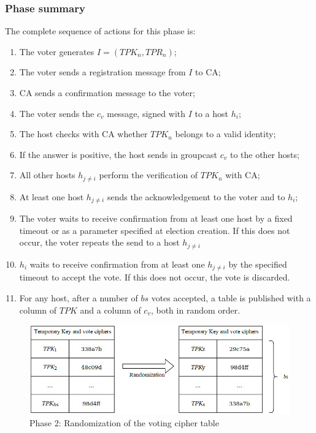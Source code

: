\documentclass[english]{textolivre}
\begin{document}
\subsubsection{Phase summary}

The complete sequence of actions for this phase is:

\begin{enumerate}
\item The voter generates $I = (TPK_{n}, TPR_{n})$;
\item The voter sends a registration message from $I$ to CA;
\item CA sends a confirmation message to the voter;
\item The voter sends the $c_{v}$ message, signed with $I$ to a host $h_{i}$;
\item The host checks with CA whether $TPK_{n}$ belongs to a valid identity;
\item If the answer is positive, the host sends in groupcast $c_{v}$ to the other hosts;

\item All other hosts $h_{j \neq i}$ perform the verification of $TPK_{n}$ with CA;

\item At least one host $h_{j \neq i}$ sends the acknowledgement to the voter and to $h_{i}$;

\item The voter waits to receive confirmation from at least one host by a fixed timeout or as a parameter specified at election creation. If this does not occur, the voter repeats the send to a host $h_{j \neq i}$

\item $h_{i}$ waits to receive confirmation from at least one $h_{j \neq i}$ by the specified timeout to accept the vote. If this does not occur, the vote is discarded.

\item For any host, after a number of $bs$ votes accepted, a table is published with a column of $TPK$ and a column of $c_{v}$, both in random order.

\end{enumerate}

\begin{figure}[htb]
\centering
\begin{minipage}{.8\textwidth}
\includegraphics[width=\textwidth]{imagens/fig-004.png}
\caption{Phase 2: Randomization of the voting cipher table}\label{randomizacao}
\end{minipage}
\end{figure}
\end{document}
